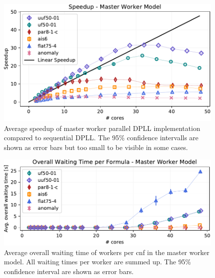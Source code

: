 \documentclass[letterpaper]{article}
\begin{document}
\begin{figure}[h!]
    \centering
    \includegraphics[width=\columnwidth]{figures/scaling_parallel_subset_dpll_scaling_tar.pdf}
    \caption{Average speedup of master worker parallel DPLL implementation compared to sequential DPLL.
    The 95\% confidence intervalls are shown as error bars but too small to be visible in some cases.
    \label{fig:dpll_parallel_speedup}}
\end{figure}
\begin{figure}[h!]
    \centering
    \includegraphics[width=\columnwidth]{figures/waiting_parallel_subset_dpll_scaling_tar.pdf}
    \caption{Average overall waiting time of workers per cnf in the master worker model.
    All waiting times per worker are summed up.
    The 95\% confidence interval are shown as error bars.}
    \label{fig:dpll_parallel_waiting}
\end{figure}
\end{document}

